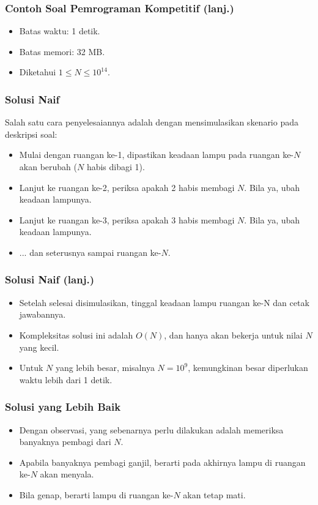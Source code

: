 \begin{frame}
\frametitle{Contoh Soal Pemrograman Kompetitif (lanj.)}
\begin{itemize}
  \item Batas waktu: 1 detik.
  \item Batas memori: 32 MB.
  \item Diketahui $1 \leq N \leq 10^{14}$.
\end{itemize}
\end{frame}

\begin{frame}
\frametitle{Solusi Naif}
Salah satu cara penyelesaiannya adalah dengan mensimulasikan skenario pada deskripsi soal:
\begin{itemize}
  \item Mulai dengan ruangan ke-1, dipastikan keadaan lampu pada ruangan ke-$N$ akan berubah ($N$ habis dibagi 1).
  \item Lanjut ke ruangan ke-2, periksa apakah 2 habis membagi $N$. Bila ya, ubah keadaan lampunya.
  \item Lanjut ke ruangan ke-3, periksa apakah 3 habis membagi $N$. Bila ya, ubah keadaan lampunya.
  \item ... dan seterusnya sampai ruangan ke-$N$.
\end{itemize}
\end{frame}

\begin{frame}
\frametitle{Solusi Naif (lanj.)}
\begin{itemize}
  \item Setelah selesai disimulasikan, tinggal keadaan lampu ruangan ke-N dan cetak jawabannya.
  \item Kompleksitas solusi ini adalah $O(N)$, dan hanya akan bekerja untuk nilai $N$ yang kecil.
  \item Untuk $N$ yang lebih besar, misalnya $N = 10^9$, kemungkinan besar diperlukan waktu lebih dari 1 detik.
\end{itemize}
\end{frame}

\begin{frame}
\frametitle{Solusi yang Lebih Baik}
\begin{itemize}
  \item Dengan observasi, yang sebenarnya perlu dilakukan adalah memeriksa banyaknya pembagi dari $N$.
  \item Apabila banyaknya pembagi ganjil, berarti pada akhirnya lampu di ruangan ke-$N$ akan menyala.
  \item Bila genap, berarti lampu di ruangan ke-$N$ akan tetap mati.
\end{itemize}
\end{frame}

